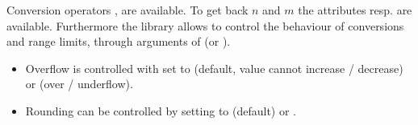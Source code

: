 \documentclass[margin=small]{tex/hsrzf}
\begin{document}
Conversion operators ,  are available. To get back \(n\) and \(m\) the attributes  resp.  are available. Furthermore the library allows to control the behaviour of conversions and range limits, through arguments of  (or ).
\begin{itemize}
  \item Overflow is controlled with  set to  (default, value cannot increase / decrease) or  (over / underflow).
  \item Rounding can be controlled by setting  to  (default) or .
\end{itemize}
\end{document}
